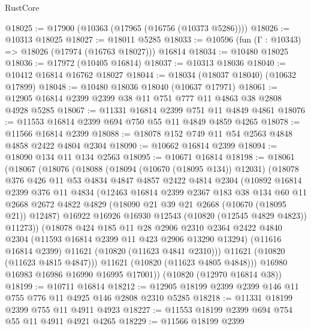 \begin{lexlean}{RustCore}
\begin{coremodule}
@18025 := @17900 (@10363 (@17965 (@16756 (@10373 @5286))))
@18026 := @10313 @18025
@18027 := @18011 @5285
@18033 := @10596 (fun (Γ : @10343) => @18026 (@17974 (@16763 @18027))) @16814
@18034 := @10480 @18025
@18036 := @17972 (@10405 @16814)
@18037 := @10313 @18036
@18040 := @10412 @16814 @16762 @18027
@18044 := @18034 (@18037 @18040) (@10632 @17899)
@18048 := @10480 @18036 @18040 (@10637 @17971)
@18061 := @12905 @16814 @2399 @2399 @38 @11 @751 @777 @11 @4863 @38 @2808 @4928 @5285
@18067 := @11331 @16814 @2399 @751 @11 @4849 @4861
@18076 := @11553 @16814 @2399 @694 @750 @55 @11 @4849 @4859 @4265
@18078 := @11566 @16814 @2399
@18088 := @18078 @152 @749 @11 @54 @2563 @4848 @4858 @2422 @4804 @2304
@18090 := @10662 @16814 @2399
@18094 := @18090 @134 @11 @134 @2563
@18095 := @10671 @16814
@18198 := @18061
    (@18067
      (@18076
        (@18088
          (@18094 (@10670 (@18095 @134)) @12031)
          (@18078
            @376
            @426
            @11
            @53
            @4834
            @4847
            @4857
            @2422
            @4814
            @2304
            (@10892
              @16814
              @2399
              @376
              @11
              @4834
              (@12463
                @16814
                @2399
                @2367
                @183
                @38
                @134
                @60
                @11
                @2668
                @2672
                @4822
                @4829
                (@18090 @21 @39 @21 @2668 (@10670 (@18095 @21)) @12487)
                @16922
                @16926
                @16930
                @12543
                (@10820 (@12545 @4829 @4823))
                @11273))
            (@18078
              @424
              @185
              @11
              @28
              @2906
              @2310
              @2364
              @2422
              @4840
              @2304
              (@11593 @16814 @2399 @11 @423 @2906 @13290 @13294)
              (@11616 @16814 @2399)
              @11621
              (@10820 (@11623 @4841 @2310)))
            @11621
            (@10820 (@11623 @4815 @4847)))
          @11621
          (@10820 (@11623 @4805 @4848)))
        @16980
        @16983
        @16986
        @16990
        @16995
        @17001))
    (@10820 (@12970 @16814 @38))
@18199 := @10711 @16814
@18212 := @12905 @18199 @2399 @2399 @146 @11 @755 @776 @11 @4925 @146 @2808 @2310 @5285
@18218 := @11331 @18199 @2399 @755 @11 @4911 @4923
@18227 := @11553 @18199 @2399 @694 @754 @55 @11 @4911 @4921 @4265
@18229 := @11566 @18199 @2399

\end{coremodule}
\end{lexlean}
